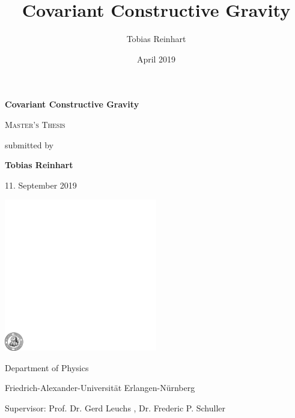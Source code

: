 \documentclass[a4paper,12pt, DIV=14, BCOR=5mm, twoside, headsepline, numbers=noenddot]{scrbook}
\title{Covariant Constructive Gravity}
\author{Tobias Reinhart }
\date{April 2019}
\begin{document}
\frontmatter

\begin{titlepage}
	\centering

	{\Huge\bfseries Covariant Constructive Gravity\par}
	\vspace{2cm}
	
	{\scshape\Large Master's Thesis \par}
	\vspace{1cm}
	{ submitted by \par}
	
	
	
	{\bfseries Tobias Reinhart\par}
		{ 11. September 2019\par}
	\vspace{2cm}
	
	\includegraphics[width=0.5\textwidth]{fau-siegel.pdf}\par
	\vspace{1cm}Department of Physics\par
	Friedrich-Alexander-Universität Erlangen-Nürnberg\par
	Supervisor: Prof. Dr. Gerd Leuchs , Dr. Frederic P. Schuller
	
	\vfill
\end{titlepage}
\end{document}
